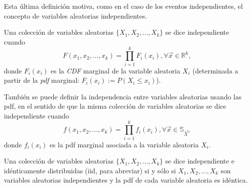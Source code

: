 	Esta última definición motiva, como en el caso de los eventos independientes, el concepto de variables aleatorias independientes.
	
	\begin{defi}
	Una colección de variables aleatorias $\{ X_1,X_2,\dots, X_k\}$ se dice independiente cuando
	$$F(x_1,x_2,\dots,x_k)=\prod_{i=1}^k F_i(x_i), \forall\vec{x}\in\mathbb{R}^k,$$
	donde $F_i(x_i)$ es la \textit{CDF} marginal de la variable aleatoria $X_i$ (determinada a partir de la \textit{pdf} marginal: $F_i(x_i):=P(X_i\leq x_i)$).
	
	También se puede definir la independencia entre variables aleatorias usando las pdf, en el sentido de que la misma colección de variables aleatorias se dice independiente cuando
	$$f(x_1,x_2,\dots,x_k)=\prod_{i=1}^k f_i(x_i), \forall\vec{x}\in\mathbb{S}_{\vec{X}},$$
	donde $f_i(x_i)$ es la pdf marginal asociada a la variable aleatoria $X_i$.
	
	\end{defi}
	
	\begin{defi}
		Una colección de variables aleatorias $\{ X_1,X_2,\dots, X_k\}$ se dice independiente e idénticamente distribuidas (iid, para abreviar) si y sólo si $X_1,X_2,\dots,X_k$ son variables aleatorias independientes y la pdf de cada variable aleatoria es idéntica.
	\end{defi}
	
